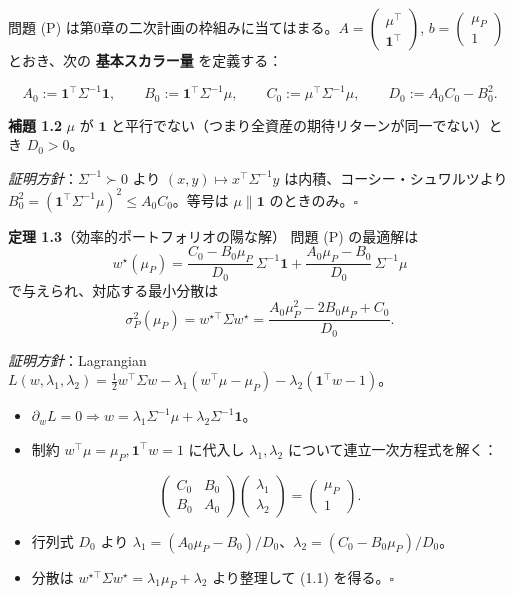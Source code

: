 \documentclass[11pt,a4paper]{report}
\begin{document}
問題 (P) は第0章の二次計画の枠組みに当てはまる。$A = \begin{pmatrix} \mu^\top \\ \mathbf{1}^\top \end{pmatrix}$, $b = \begin{pmatrix} \mu_P \\ 1 \end{pmatrix}$ とおき、次の \textbf{基本スカラー量} を定義する：

\[ A_0 := \mathbf{1}^\top \Sigma^{-1} \mathbf{1}, \qquad B_0 := \mathbf{1}^\top \Sigma^{-1} \mu, \qquad C_0 := \mu^\top \Sigma^{-1} \mu, \qquad D_0 := A_0 C_0 - B_0^2. \]

\textbf{補題 1.2} $\mu$ が $\mathbf{1}$ と平行でない（つまり全資産の期待リターンが同一でない）とき $D_0 > 0$。

\emph{証明方針}：$\Sigma^{-1} \succ 0$ より $(x, y) \mapsto x^\top \Sigma^{-1} y$ は内積、コーシー・シュワルツより $B_0^2 = (\mathbf{1}^\top \Sigma^{-1} \mu)^2 \le A_0 C_0$。等号は $\mu \parallel \mathbf{1}$ のときのみ。$\square$

\textbf{定理 1.3}（効率的ポートフォリオの陽な解） 問題 (P) の最適解は \[ \boxed{\; w^\star(\mu_P) = \frac{C_0 - B_0 \mu_P}{D_0}\, \Sigma^{-1} \mathbf{1} + \frac{A_0 \mu_P - B_0}{D_0}\, \Sigma^{-1} \mu \;} \] で与えられ、対応する最小分散は \[ \sigma_P^2(\mu_P) = w^{\star\top} \Sigma w^\star = \frac{A_0 \mu_P^2 - 2 B_0 \mu_P + C_0}{D_0}. \tag{1.1} \]

\emph{証明方針}：Lagrangian $L(w, \lambda_1, \lambda_2) = \tfrac{1}{2} w^\top \Sigma w - \lambda_1 (w^\top \mu - \mu_P) - \lambda_2(\mathbf{1}^\top w - 1)$。
\begin{itemize}
\item $\partial_w L = 0 \Rightarrow w = \lambda_1 \Sigma^{-1}\mu + \lambda_2 \Sigma^{-1}\mathbf{1}$。
\item 制約 $w^\top \mu = \mu_P, \mathbf{1}^\top w = 1$ に代入し $\lambda_1, \lambda_2$ について連立一次方程式を解く：
\end{itemize}
\[ \begin{pmatrix} C_0 & B_0 \\ B_0 & A_0 \end{pmatrix} \begin{pmatrix} \lambda_1 \\ \lambda_2 \end{pmatrix} = \begin{pmatrix} \mu_P \\ 1 \end{pmatrix}. \]
\begin{itemize}
\item 行列式 $D_0$ より $\lambda_1 = (A_0 \mu_P - B_0)/D_0$、$\lambda_2 = (C_0 - B_0 \mu_P)/D_0$。
\item 分散は $w^{\star\top}\Sigma w^\star = \lambda_1 \mu_P + \lambda_2$ より整理して (1.1) を得る。$\square$
\end{itemize}
\end{document}
